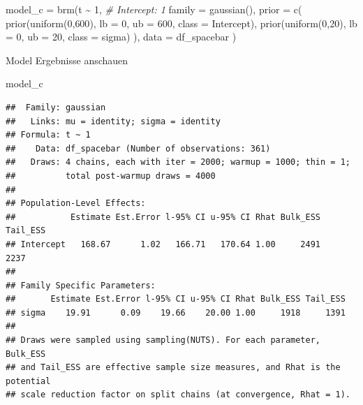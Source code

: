 \documentclass[
]{article}
\newenvironment{Shaded}{\begin{snugshade}}{\end{snugshade}}
\newcommand{\AttributeTok}[1]{\textcolor[rgb]{0.77,0.63,0.00}{#1}}
\newcommand{\CommentTok}[1]{\textcolor[rgb]{0.56,0.35,0.01}{\textit{#1}}}
\newcommand{\DecValTok}[1]{\textcolor[rgb]{0.00,0.00,0.81}{#1}}
\newcommand{\FunctionTok}[1]{\textcolor[rgb]{0.00,0.00,0.00}{#1}}
\newcommand{\NormalTok}[1]{#1}
\newcommand{\OtherTok}[1]{\textcolor[rgb]{0.56,0.35,0.01}{#1}}
\newcommand{\SpecialCharTok}[1]{\textcolor[rgb]{0.00,0.00,0.00}{#1}}
\begin{document}
\begin{Shaded}
\begin{Highlighting}[]
\NormalTok{model\_c }\OtherTok{=} \FunctionTok{brm}\NormalTok{(t }\SpecialCharTok{\textasciitilde{}} \DecValTok{1}\NormalTok{,    }\CommentTok{\# Intercept: 1}
              \AttributeTok{family =} \FunctionTok{gaussian}\NormalTok{(),}
              \AttributeTok{prior =}
                  \FunctionTok{c}\NormalTok{(}
                    \FunctionTok{prior}\NormalTok{(}\FunctionTok{uniform}\NormalTok{(}\DecValTok{0}\NormalTok{,}\DecValTok{600}\NormalTok{), }\AttributeTok{lb =} \DecValTok{0}\NormalTok{, }\AttributeTok{ub =} \DecValTok{600}\NormalTok{, }\AttributeTok{class =}\NormalTok{ Intercept),}
                    \FunctionTok{prior}\NormalTok{(}\FunctionTok{uniform}\NormalTok{(}\DecValTok{0}\NormalTok{,}\DecValTok{20}\NormalTok{), }\AttributeTok{lb =} \DecValTok{0}\NormalTok{, }\AttributeTok{ub =} \DecValTok{20}\NormalTok{, }\AttributeTok{class =}\NormalTok{ sigma)}
\NormalTok{                  ),}
                \AttributeTok{data =}\NormalTok{ df\_spacebar}
\NormalTok{              )}
\end{Highlighting}
\end{Shaded}

Model Ergebnisse anschauen

\begin{Shaded}
\begin{Highlighting}[]
\NormalTok{model\_c}
\end{Highlighting}
\end{Shaded}

\begin{verbatim}
##  Family: gaussian 
##   Links: mu = identity; sigma = identity 
## Formula: t ~ 1 
##    Data: df_spacebar (Number of observations: 361) 
##   Draws: 4 chains, each with iter = 2000; warmup = 1000; thin = 1;
##          total post-warmup draws = 4000
## 
## Population-Level Effects: 
##           Estimate Est.Error l-95% CI u-95% CI Rhat Bulk_ESS Tail_ESS
## Intercept   168.67      1.02   166.71   170.64 1.00     2491     2237
## 
## Family Specific Parameters: 
##       Estimate Est.Error l-95% CI u-95% CI Rhat Bulk_ESS Tail_ESS
## sigma    19.91      0.09    19.66    20.00 1.00     1918     1391
## 
## Draws were sampled using sampling(NUTS). For each parameter, Bulk_ESS
## and Tail_ESS are effective sample size measures, and Rhat is the potential
## scale reduction factor on split chains (at convergence, Rhat = 1).
\end{verbatim}
\end{document}
